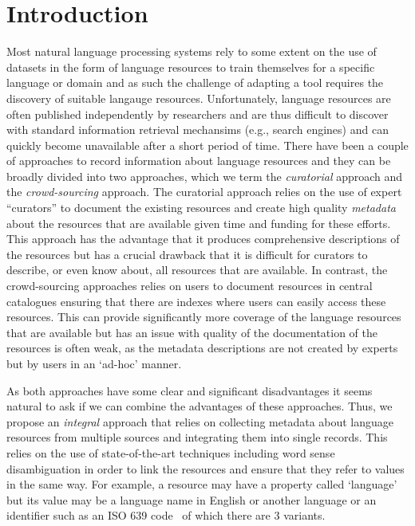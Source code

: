 \documentclass[smallextended]{svjour3}       %
\begin{document}
\section{Introduction}

Most natural language processing systems rely to some extent on the use of
datasets in the form of language resources to train themselves for a specific
language or domain and as such the challenge of adapting a tool requires the
discovery of suitable langauge resources. Unfortunately, language resources are
often published independently by researchers and are thus difficult to discover
with standard information retrieval mechansims (e.g., search engines) and can
quickly become unavailable after a short period of time. There have been a couple of approaches to
record information about language resources and they can be broadly divided into two approaches, which we
term the \emph{curatorial} approach and the \emph{crowd-sourcing} approach. The
curatorial approach relies on the use of expert ``curators'' to document the
existing resources and create high quality \emph{metadata} about the resources
that are available given time and funding for these efforts. This approach has the advantage that it produces
comprehensive descriptions of the resources but has a crucial drawback that it
is difficult for curators to describe, or even know about, all resources that
are available. In contrast, the crowd-sourcing approaches relies on users to
document resources in central catalogues ensuring that there are indexes where
users can easily access these resources. This can provide significantly more
coverage of the language resources that are available but has an issue with
quality of the documentation of the resources is often weak, as the metadata
descriptions are not created by experts but by users in an `ad-hoc' manner.

As both approaches have some clear and significant disadvantages it seems
natural to ask if we can combine the advantages of these approaches.
Thus, we propose an \emph{integral} approach that relies on
collecting metadata about language resources from multiple sources and
integrating them into single records. This relies on the use of state-of-the-art
techniques including word sense disambiguation in order to link the resources
and ensure that they refer to values in the same way. For example, a resource
may have a property called `language' but its value may be a language name in
English or another language or an identifier such as an ISO 639
code~\cite{gordon2005ethnologue} of which there are 3 variants. 
\end{document}
